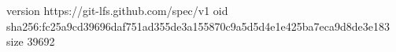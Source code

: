 version https://git-lfs.github.com/spec/v1
oid sha256:fc25a9cd39696daf751ad355de3a155870c9a5d5d4e1e425ba7eca9d8de3e183
size 39692
